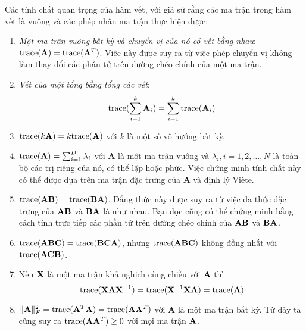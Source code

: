 Các tính chất quan trọng của hàm vết, với giả sử rằng các ma trận trong hàm
vết là vuông và các phép nhân ma trận thực hiện được:
\begin{enumerate}
\item \textit{Một ma trận vuông bất kỳ và chuyển vị của nó có vết bằng
nhau}: $\text{trace}(\mathbf{A}) = \text{trace}(\mathbf{A}^T)$. Việc này được suy ra từ việc phép
chuyển vị không làm thay đổi các phần tử trên đường chéo chính của một ma
trận.


\item \textit{Vết của một tổng bằng tổng các vết}:
$$\displaystyle\text{trace}(\sum_{i=1}^k \mathbf{A}_i) = \sum_{i=1}^k \text{trace}(\mathbf{A}_i)$$

\item $\text{trace}(k\mathbf{A}) = k\text{trace}(\mathbf{A})$ với $k$ là một
số vô hướng bất kỳ.

\item $\text{trace}(\mathbf{A}) = \sum_{i = 1}^D \lambda_i $ với
$\mathbf{A}$ là một ma trận vuông và $\lambda_i, i = 1, 2, \dots, N$ là toàn
bộ các trị riêng của nó, có thể lặp hoặc phức. Việc chứng minh tính chất này
có thể được dựa trên ma trận đặc trưng của $\mathbf{A}$ và định lý Viète.

\item $\text{trace}(\mathbf{AB}) = \text{trace}(\mathbf{BA})$. Đẳng thức này
được suy ra từ việc đa thức đặc trưng của $\mathbf{A}\mathbf{B}$ và $\mathbf{B}\mathbf{A}$ là như nhau.
Bạn đọc cũng có thể chứng minh bằng cách tính trực tiếp các phần tử trên
đường chéo chính của $\mathbf{A}\mathbf{B}$ và $\mathbf{B}\mathbf{A}$.

\item $\text{trace}(\mathbf{A}\mathbf{B}\mathbf{C}) = \text{trace}(\mathbf{B}\mathbf{C}\mathbf{A})$, nhưng $\text{trace}(\mathbf{A}\mathbf{B}\mathbf{C})$
không đồng nhất với $\text{trace}(\mathbf{A}\mathbf{C}\mathbf{B})$.

\item Nếu $\mathbf{X}$ là một ma trận khả nghịch cùng chiều với $\mathbf{A}$ thì
\begin{equation*}
\text{trace} (\mathbf{X}\mathbf{A}\mathbf{X}^{-1}) = \text{trace}(\mathbf{X}^{-1}\mathbf{X}\mathbf{A}) = \text{trace}(\mathbf{A})
\end{equation*}
\item $\|\mathbf{A}\|_F^2 = \text{trace}(\mathbf{A}^T\mathbf{A}) =
\text{trace}(\mathbf{A}\mathbf{A}^T)$ với $\mathbf{A}$ là một ma trận bất kỳ. Từ
đây ta cũng suy ra $\text{trace}(\mathbf{A}\mathbf{A}^T) \geq 0$ với mọi ma trận $\mathbf{A}$.

\end{enumerate}
